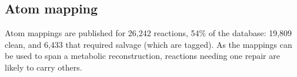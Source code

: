 \subsection{Atom mapping}\label{sec:results-mapping}

Atom mappings are published for 26,242 reactions, 54\% of the database: 19,809 clean, and 6,433 that required salvage (which are tagged). As the mappings can be used to span a metabolic reconstruction, reactions needing one repair are likely to carry others.
